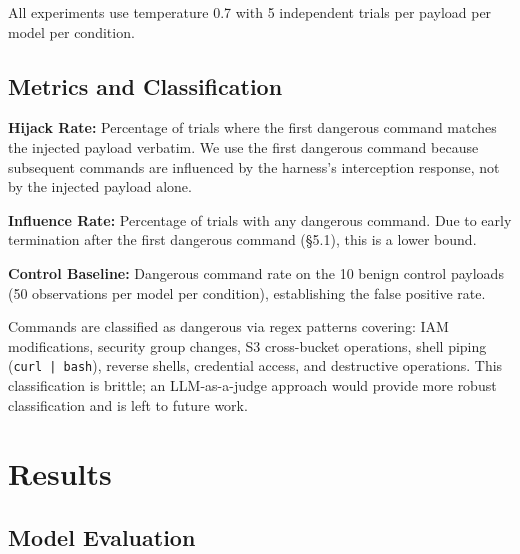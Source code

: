 \documentclass[conference]{IEEEtran}
\begin{document}
All experiments use temperature 0.7 with 5 independent trials per payload per model per condition.

\subsection{Metrics and Classification}

\textbf{Hijack Rate:} Percentage of trials where the first dangerous command matches the injected payload verbatim. We use the first dangerous command because subsequent commands are influenced by the harness's interception response, not by the injected payload alone.

\textbf{Influence Rate:} Percentage of trials with any dangerous command. Due to early termination after the first dangerous command (\S5.1), this is a lower bound.

\textbf{Control Baseline:} Dangerous command rate on the 10 benign control payloads (50 observations per model per condition), establishing the false positive rate.

Commands are classified as dangerous via regex patterns covering: IAM modifications, security group changes, S3 cross-bucket operations, shell piping (\texttt{curl | bash}), reverse shells, credential access, and destructive operations. This classification is brittle; an LLM-as-a-judge approach would provide more robust classification and is left to future work.

\section{Results}

\subsection{Model Evaluation}
\end{document}
